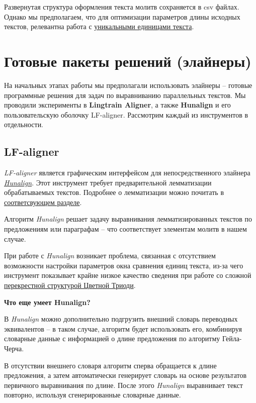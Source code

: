 \documentclass[
  letterpaper,
]{book}
\begin{document}
Развернутая структура оформления текста молитв сохраняется в csv файлах.
Однако мы предполагаем, что для оптимизации параметров длины исходных
текстов, релевантна работа с
\href{https://github.com/Drozhzhinastya/GSPC/tree/main/texts/unique_units}{уникальными
единицами текста}.


\hypertarget{sec-about_aligners}{%
\chapter{Готовые пакеты решений (элайнеры)}\label{sec-about_aligners}}

На начальных этапах работы мы предполагали использовать элайнеры --
готовые программные решения для задач по выравниванию параллельных
текстов. Мы проводили эксперименты в \textbf{Lingtrain Aligner}, а также
\textbf{Hunalign} и его пользовательскую оболочку LF-aligner. Рассмотрим
каждый из инструментов в отдельности.

\hypertarget{sec-lf_aligner}{%
\section{LF-aligner}\label{sec-lf_aligner}}

\emph{LF-aligner} является графическим интерфейсом для непосредственного
элайнера
\emph{\href{https://github.com/danielvarga/hunalign}{Hunalign}}. Этот
инструмент требует предварительной лемматизации обрабатываемых текстов.
Подробнее о лемматизации можно почитать в
\protect\hyperlink{sec-about_lemmatization}{соответсвующем разделе}.

Алгоритм \emph{Hunalign} решает задачу выравнивания лемматизированных
текстов по предложениям или параграфам -- что соответствует элементам
молитв в нашем случае.

При работе с \emph{Hunalign} возникает проблема, связанная с отсутствием
возможности настройки параметров окна сравнения единиц текста, из-за
чего инструмент показывает крайне низкое качество сведения при работе со
сложной \protect\hyperlink{sec-element_order}{перекрестной структурой
Цветной Триоди}.

\begin{tcolorbox}[enhanced jigsaw, opacityback=0, toprule=.15mm, breakable, arc=.35mm, colback=white, left=2mm, bottomrule=.15mm, leftrule=.75mm, colframe=quarto-callout-note-color-frame, rightrule=.15mm]

\textbf{Что еще умеет Hunalign?}\vspace{2mm}

В \emph{Hunalign} можно дополнительно подгрузить внешний словарь
переводных эквивалентов -- в таком случае, алгоритм будет использовать
его, комбинируя словарные данные с информацией о длине предложения по
алгоритму Гейла-Черча.\footnotemark{}

В отсутствии внешнего словаря алгоритм сперва обращается к длине
предложения, а затем автоматически генерирует словарь на основе
результатов первичного выравнивания по длине. После этого
\emph{Hunalign} выравнивает текст повторно, используя сгенерированные
словарные данные.

\end{tcolorbox}
\end{document}
